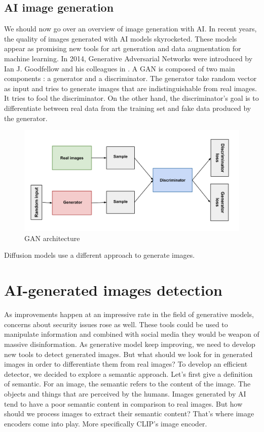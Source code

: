 \documentclass[12pt,a4paper]{article}
\begin{document}
\subsection*{AI image generation}
We should now go over an overview of image generation with AI. In recent years, the quality of images generated with AI models skyrocketed. These models appear as promising new tools for art generation and data augmentation for machine learning. In 2014, Generative Adversarial Networks were introduced by Ian J. Goodfellow and his colleagues in \autocite*{goodfellowGenerativeAdversarialNetworks2014}. A GAN is composed of two main components : a generator and a discriminator. The generator take random vector as input and tries to generate images that are indistinguishable from real images. It tries to fool the discriminator. On the other hand, the discriminator's goal is to differentiate between real data from the training set and fake data produced by the generator.
\begin{figure}[H]
    \centering
    \includegraphics[width=\textwidth]{img/GAN.png}
    \caption{GAN architecture}
\end{figure}

Diffusion models use a different approach to generate images.

\section{AI-generated images detection}
As improvements happen at an impressive rate in the field of generative models, concerns about security issues rose as well. These tools could be used to manipulate information and combined with social media they would be weapon of massive disinformation. As generative model keep improving, we need to develop new tools to detect generated images. But what should we look for in generated images in order to differentiate them from real images? To develop an efficient detector, we decided to explore a semantic approach. Let's first give a definition of semantic. For an image, the semantic refers to the content of the image. The objects and things that are perceived by the humans. Images generated by AI tend to have a poor semantic content in comparison to real images. But how should we process images to extract their semantic content? That's where image encoders come into play. More specifically CLIP's image encoder.
\end{document}
